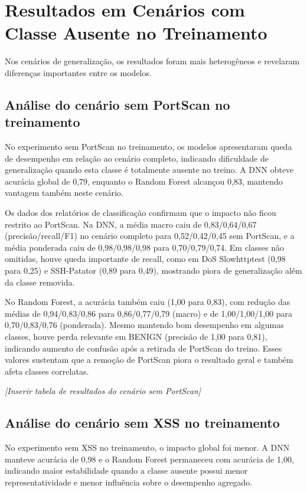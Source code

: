 \documentclass[12pt,oneside]{abntex2}
\begin{document}
\section{Resultados em Cenários com Classe Ausente no Treinamento}

Nos cenários de generalização, os resultados foram mais heterogêneos e revelaram diferenças importantes entre os modelos.

\subsection{Análise do cenário sem PortScan no treinamento}

No experimento sem PortScan no treinamento, os modelos apresentaram queda de desempenho em relação ao cenário completo, indicando dificuldade de generalização quando esta classe é totalmente ausente no treino. A DNN obteve acurácia global de 0,79, enquanto o Random Forest alcançou 0,83, mantendo vantagem também neste cenário.

Os dados dos relatórios de classificação confirmam que o impacto não ficou restrito ao PortScan. Na DNN, a média macro caiu de 0,83/0,64/0,67 (precisão/recall/F1) no cenário completo para 0,52/0,42/0,45 sem PortScan, e a média ponderada caiu de 0,98/0,98/0,98 para 0,70/0,79/0,74. Em classes não omitidas, houve queda importante de recall, como em DoS Slowhttptest (0,98 para 0,25) e SSH-Patator (0,89 para 0,49), mostrando piora de generalização além da classe removida.

No Random Forest, a acurácia também caiu (1,00 para 0,83), com redução das médias de 0,94/0,83/0,86 para 0,86/0,77/0,79 (macro) e de 1,00/1,00/1,00 para 0,70/0,83/0,76 (ponderada). Mesmo mantendo bom desempenho em algumas classes, houve perda relevante em BENIGN (precisão de 1,00 para 0,81), indicando aumento de confusão após a retirada de PortScan do treino. Esses valores sustentam que a remoção de PortScan piora o resultado geral e também afeta classes correlatas.

\begin{center}
\textit{[Inserir tabela de resultados do cenário sem PortScan]} 
\end{center}

\subsection{Análise do cenário sem XSS no treinamento}

No experimento sem XSS no treinamento, o impacto global foi menor. A DNN manteve acurácia de 0,98 e o Random Forest permaneceu com acurácia de 1,00, indicando maior estabilidade quando a classe ausente possui menor representatividade e menor influência sobre o desempenho agregado.
\end{document}

